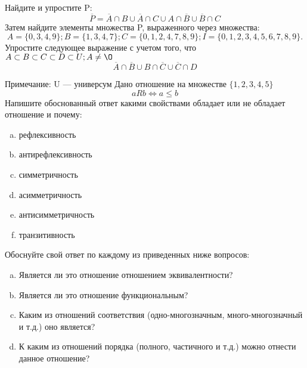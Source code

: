\documentclass[10pt]{exam}
\begin{document}
\begin{questions}
\question
Найдите и упростите P:
\begin{equation*}
\overline{P} = \overline{A} \cap B \cup \overline{A} \cap C \cup A \cap \overline{B} \cup \overline{B} \cap C
\end{equation*}
Затем найдите элементы множества P, выраженного через множества:
\begin{equation*}
A = \{0, 3, 4, 9\}; 
B = \{1, 3, 4, 7\};
C = \{0, 1, 2, 4, 7, 8, 9\};
I = \{0, 1, 2, 3, 4, 5, 6, 7, 8, 9\}.
\end{equation*}\question
Упростите следующее выражение с учетом того, что $A\subset B \subset C \subset D \subset U; A \neq \O$
\begin{equation*}
\overline{A} \cap \overline{B} \cup B \cap \overline{C} \cup \overline{C} \cap D
\end{equation*}

Примечание: U — универсум\question
Дано отношение на множестве $\{1, 2, 3, 4, 5\}$ 
\begin{equation*}
aRb \iff a \leq b
\end{equation*}
Напишите обоснованный ответ какими свойствами обладает или не обладает отношение и почему:   
\begin{enumerate} [a)]\setcounter{enumi}{0}
\item рефлексивность
\item антирефлексивность
\item симметричность
\item асимметричность
\item антисимметричность
\item транзитивность
\end{enumerate}

Обоснуйте свой ответ по каждому из приведенных ниже вопросов:
\begin{enumerate} [a)]\setcounter{enumi}{0}
    \item Является ли это отношение отношением эквивалентности?
    \item Является ли это отношение функциональным?
    \item Каким из отношений соответствия (одно-многозначным, много-многозначный и т.д.) оно является?
    \item К каким из отношений порядка (полного, частичного и т.д.) можно отнести данное отношение?
\end{enumerate}



\end{questions}
\end{document}
